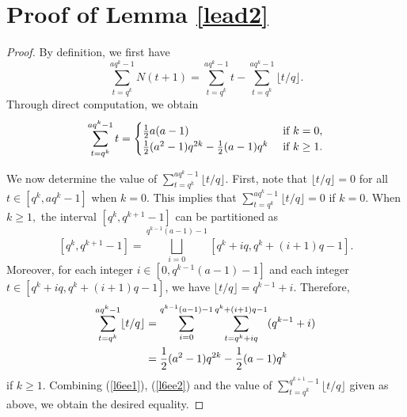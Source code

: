\documentclass[journal,onecolumn]{IEEEtran}
\begin{document}
\section{Proof of Lemma \ref{lead2}}

\begin{proof}
By definition, we first have 
\begin{equation}\label{l6ee1}
\sum\limits_{t=q^{k}}^{aq^{k}-1}N(t+1)=\sum\limits_{t=q^{k}}^{aq^{k}-1}t-\sum\limits_{t=q^{k}}^{aq^{k}-1}\lfloor t/q\rfloor.
\end{equation}
Through direct computation, we obtain 
\begin{equation}\label{l6ee2}
\sum\limits_{t=q^{k}}^{aq^{k}-1}t=
\begin{cases}
\frac{1}{2}a(a-1)&\hbox{ if } k=0,\\
\frac{1}{2}(a^2-1)q^{2k}-\frac{1}{2}(a-1)q^k&\hbox{ if } k\geq 1.
\end{cases}
\end{equation}

We now  determine the value of $\sum\limits_{t=q^{k}}^{aq^{k}-1}\lfloor t/q\rfloor.$ First, note that 
$\lfloor t/q\rfloor=0$ for all $t\in \left[q^k,aq^{k}-1\right]$  when  $k=0$. This implies that     
$\sum\limits_{t=q^k}^{aq^{k}-1}\lfloor t/q\rfloor =0$ if $k=0$.   
 When  $k\geq 1,$  the interval 
$\left[q^{k}, q^{k+1}-1\right]$ can be partitioned as \begin{equation*}\left[q^{k}, q^{k+1}-1\right]=\bigsqcup\limits_{i=0}^{q^{k-1}(a-1)-1}
\left[q^{k}+i q, q^{k}+(i+1)q-1\right].\end{equation*}  Moreover, for each integer $i\in \left[0,q^{k-1}(a-1)-1\right]$ and each  integer $t\in \left[q^{k}+i q, q^{k}+(i+1)q-1\right]$, we have   $\lfloor t/q\rfloor =q^{k-1}+i$.  Therefore,  
  \begin{equation}\notag
\begin{split}\sum\limits_{t=q^{k}}^{aq^{k}-1}\lfloor t/q\rfloor&=\sum\limits_{i=0}^{q^{k-1}(a-1)-1}\sum\limits_{t=q^{k}+i q}^{q^k+(i+1)q-1}(q^{k-1}+i)\\
     &=\frac{1}{2}(a^2-1)q^{2k}-\frac{1}{2}(a-1)q^k 
     \end{split}
 \end{equation}
  if   $k\geq 1.$  
Combining (\ref{l6ee1}), (\ref{l6ee2}) and the value of $\sum\limits_{t=q^k}^{q^{k+1}-1}\lfloor t/q\rfloor$ given as above,  we obtain the desired equality. 
\end{proof}
\end{document}
